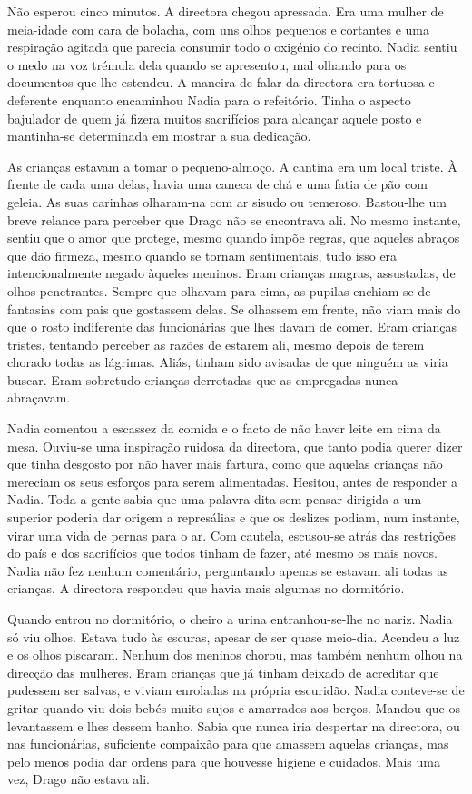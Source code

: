 Não esperou cinco minutos. A directora chegou apressada. Era uma
mulher de meia-idade com cara de bolacha, com uns olhos pequenos e
cortantes e uma respiração agitada que parecia consumir todo o oxigénio
do recinto. Nadia sentiu o medo na voz trémula dela quando se apresentou, mal olhando para os documentos que lhe estendeu. A maneira de
falar da directora era tortuosa e deferente enquanto encaminhou Nadia
para o refeitório. Tinha o aspecto bajulador de quem já fizera muitos
sacrifícios para alcançar aquele posto e mantinha-se determinada em mostrar a sua dedicação.

As crianças estavam a tomar o pequeno-almoço. A cantina era um local
triste. À frente de cada uma delas, havia uma caneca de chá e uma fatia
de pão com geleia. As suas carinhas olharam-na com ar sisudo ou
temeroso. Bastou-lhe um breve relance para perceber que Drago não se encontrava ali. No
mesmo instante, sentiu que o amor que protege, mesmo quando impõe
regras, que aqueles abraços que dão firmeza, mesmo quando se tornam
sentimentais, tudo isso era intencionalmente negado àqueles meninos.
Eram crianças magras, assustadas, de olhos penetrantes. Sempre que
olhavam para cima, as pupilas enchiam-se de fantasias com pais que
gostassem delas. Se olhassem em frente, não viam mais do que o rosto
indiferente das funcionárias que lhes davam de comer. Eram crianças
tristes, tentando perceber as razões de estarem ali, mesmo depois de
terem chorado todas as lágrimas. Aliás, tinham sido avisadas de que
ninguém as viria buscar. Eram sobretudo crianças derrotadas que as
empregadas nunca abraçavam.

Nadia comentou a escassez da comida e o facto de não haver leite em cima
da mesa. Ouviu-se uma inspiração ruidosa da directora, que tanto podia
querer dizer que tinha desgosto por não haver mais fartura, como que
aquelas crianças não mereciam os seus esforços para serem alimentadas.
Hesitou, antes de responder a Nadia. Toda a gente sabia que uma palavra
dita sem pensar dirigida a um superior poderia dar origem a represálias
e que os deslizes podiam, num instante, virar uma vida de pernas para o
ar. Com cautela, escusou-se atrás das restrições do país e dos
sacrifícios que todos tinham de fazer, até mesmo os mais novos. Nadia
não fez nenhum comentário, perguntando apenas se estavam ali todas as
crianças. A directora respondeu que havia mais algumas no dormitório.

Quando entrou no dormitório, o cheiro a urina entranhou-se-lhe no nariz. Nadia só viu olhos. Estava tudo às escuras,
apesar de ser quase meio-dia. Acendeu a luz e os olhos piscaram. Nenhum
dos meninos chorou, mas também nenhum olhou na direcção das mulheres.
Eram crianças que já tinham deixado de acreditar que pudessem ser
salvas, e viviam enroladas na própria escuridão. Nadia conteve-se de
gritar quando viu dois bebés muito sujos e amarrados aos berços. Mandou
que os levantassem e lhes dessem banho. Sabia que nunca iria despertar
na directora, ou nas funcionárias, suficiente compaixão para que amassem aquelas crianças, mas pelo menos podia dar ordens para que houvesse
higiene e cuidados. Mais uma vez, Drago não estava ali.

